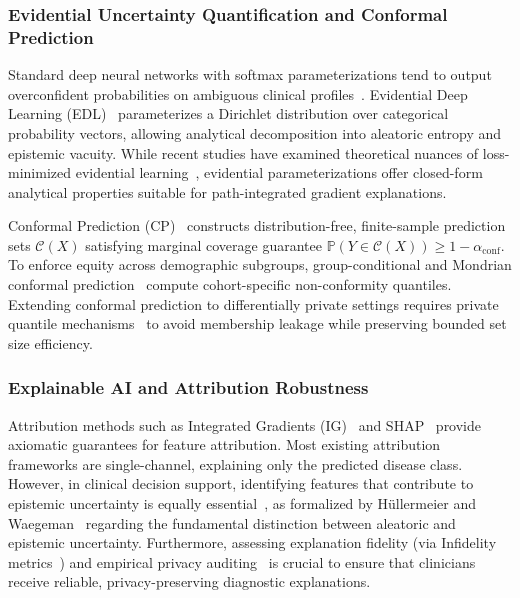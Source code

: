 \documentclass[pdflatex,sn-vancouver-num,referee,lineno]{sn-jnl}
\theoremstyle{thmstyleone}
\theoremstyle{thmstylethree}
\begin{document}
\subsubsection{Evidential Uncertainty Quantification and Conformal Prediction}
Standard deep neural networks with softmax parameterizations tend to output overconfident probabilities on ambiguous clinical profiles~\cite{kompa2021second,lakshminarayanan2017simple,gal2016dropout}. Evidential Deep Learning (EDL)~\cite{sensoy2018evidential} parameterizes a Dirichlet distribution over categorical probability vectors, allowing analytical decomposition into aleatoric entropy and epistemic vacuity. While recent studies have examined theoretical nuances of loss-minimized evidential learning~\cite{bengs2022pitfalls,charpentier2020posterior}, evidential parameterizations offer closed-form analytical properties suitable for path-integrated gradient explanations.

Conformal Prediction (CP)~\cite{vovk2005algorithmic,angelopoulos2021gentle,tibshirani2019conformal} constructs distribution-free, finite-sample prediction sets $\mathcal{C}(X)$ satisfying marginal coverage guarantee $\mathbb{P}(Y \in \mathcal{C}(X)) \ge 1 - \alpha_{\text{conf}}$. To enforce equity across demographic subgroups, group-conditional and Mondrian conformal prediction~\cite{vovk2003mondrian,romano2020malice,sesia2020conformal,gibbs2023conformal} compute cohort-specific non-conformity quantiles. Extending conformal prediction to differentially private settings requires private quantile mechanisms~\cite{angelopoulos2021private} to avoid membership leakage while preserving bounded set size efficiency.

\subsubsection{Explainable AI and Attribution Robustness}
Attribution methods such as Integrated Gradients (IG)~\cite{sundararajan2017axiomatic} and SHAP~\cite{lundberg2017unified} provide axiomatic guarantees for feature attribution. Most existing attribution frameworks are single-channel, explaining only the predicted disease class. However, in clinical decision support, identifying features that contribute to epistemic uncertainty is equally essential~\cite{antoran2021clue,perez2022attribution}, as formalized by H{\"u}llermeier and Waegeman~\cite{hullermeier2021aleatoric} regarding the fundamental distinction between aleatoric and epistemic uncertainty. Furthermore, assessing explanation fidelity (via Infidelity metrics~\cite{yeh2019infidelity}) and empirical privacy auditing~\cite{patel2022towards,shokri2017membership,yeom2018privacy,carlini2022membership} is crucial to ensure that clinicians receive reliable, privacy-preserving diagnostic explanations.
\end{document}

